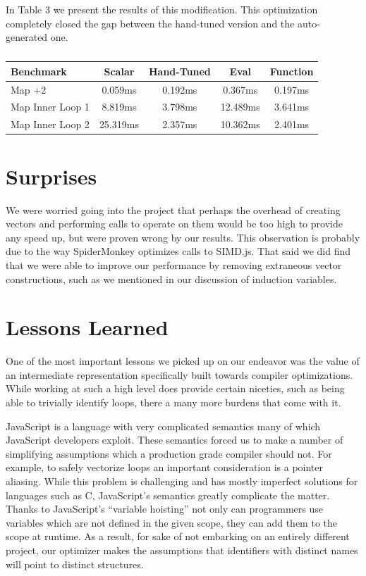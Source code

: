 \documentclass[conference]{IEEEtran}
\begin{document}
In Table 3 we present the results of this modification. This optimization
completely closed the gap between the hand-tuned version and the auto-generated
one.

\begin{table}[!t]
\centering
\caption{}
\begin{tabular}{|l||c|c|c|c|}
\hline
Benchmark & Scalar & Hand-Tuned & Eval & Function \\ \hline
Map +2 & 0.059ms & 0.192ms & 0.367ms & 0.197ms \\ \hline
Map Inner Loop 1 & 8.819ms & 3.798ms & 12.489ms & 3.641ms \\ \hline
Map Inner Loop 2 & 25.319ms & 2.357ms & 10.362ms & 2.401ms \\ \hline
\end{tabular}
\end{table}

\section{Surprises}

We were worried going into the project that perhaps the overhead of creating
vectors and performing calls to operate on them would be too high to provide
any speed up, but were proven wrong by our results. This observation is
probably due to the way SpiderMonkey optimizes calls to SIMD.js. That said we
did find that we were able to improve our performance by removing extraneous
vector constructions, such as we mentioned in our discussion of induction
variables.

\section{Lessons Learned}

One of the most important lessons we picked up on our endeavor was the value
of an intermediate representation specifically built towards compiler
optimizations. While working at such a high level does provide certain
niceties, such as being able to trivially identify loops, there a many more
burdens that come with it.

JavaScript is a language with very complicated semantics many of which
JavaScript developers exploit. These semantics forced us to make a number of
simplifying assumptions which a production grade compiler should not. For
example, to safely vectorize loops an important consideration is a pointer
aliasing. While this problem is challenging and has mostly imperfect
solutions for languages such as C, JavaScript's semantics greatly complicate
the matter.  Thanks to JavaScript's ``variable hoisting'' not only can
programmers use variables which are not defined in the given scope, they can
add them to the scope at runtime. As a result, for sake of not embarking on
an entirely different project, our optimizer makes the assumptions that
identifiers with distinct names will point to distinct structures.
\end{document}
